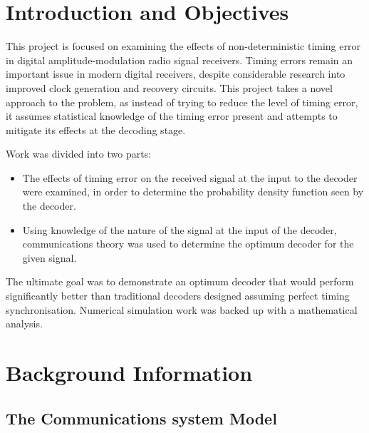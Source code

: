 
\chapter{Introduction and Objectives}

This project is focused on examining the effects of non-deterministic timing error in digital amplitude-modulation radio signal receivers. Timing errors remain an important issue in modern digital receivers, despite considerable research into improved clock generation and recovery circuits. This project takes a novel approach to the problem, as instead of trying to reduce the level of timing error, it assumes statistical knowledge of the timing error present and attempts to mitigate its effects at the decoding stage.

Work was divided into two parts:

\begin{itemize}
\item
The effects of timing error on the received signal at the input to the decoder were examined, in order to determine the probability density function seen by the decoder.
\item
Using knowledge of the nature of the signal at the input of the decoder, communications theory was used to determine the optimum decoder for the given signal.
\end{itemize}

The ultimate goal was to demonstrate an optimum decoder that would perform significantly better than traditional decoders designed assuming perfect timing synchronisation. Numerical simulation work was backed up with a mathematical analysis.

\chapter{Background Information}

\section{The Communications system Model}

